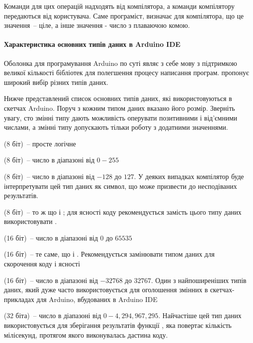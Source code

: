 \documentclass[12pt,a4paper]{report}  %
\begin{document}
Команди для цих операцій надходять від компілятора, а команди компілятору передаються від користувача. Саме програміст, визначає для компілятора, що це значення~-- ціле, а інше значення - число з плаваючою комою.

\paragraph{Характеристика основних типів даних в Arduino IDE}

Оболонка для програмування Arduino по суті являє з себе мову  з підтримкою великої кількості бібліотек для полегшення процесу написання програм.  пропонує широкий вибір різних типів даних.

Нижче представлений список основних типів даних, які використовуються в скетчах Arduino. Поруч з кожним типом даних вказано його розмір. Зверніть увагу, сто змінні типу  дають можливість оперувати позитивними і від'ємними числами, а змінні типу  допускають тільки роботу з додатними значеннями.

     (8 біт)~-- просте логічне 
    
     (8 біт)~--  число в діапазоні від $0-255$
    
     (8 біт)~--  число в діапазоні від $-128$ до $127$. У деяких випадках компілятор буде інтерпретувати цей тип даних як символ, що може призвести до несподіваних результатів.
    
     (8 біт)~-- то ж що і ; для ясності коду рекомендується замість цього типу даних використовувати .
    
     (16 біт)~--  число в діапазоні від $0$ до $65535$
    
     (16 біт)~-- те саме, що і . Рекомендується замінювати типом даних  для скорочення коду і ясності
    
     (16 біт)~-- число в діапазоні від $-32768$ до $32767$. Один з найпоширеніших типів даних, який дуже часто використовується для оголошення змінних в скетчах-прикладах для Arduino, вбудованих в Arduino IDE
    
     (32 біта)~--  число в діапазоні від $0-4,294,967,295$. Найчастіше цей тип даних використовується для зберігання результатів функції , яка повертає кількість мілісекунд, протягом якого виконувалась дастина коду.
    
\end{document}

